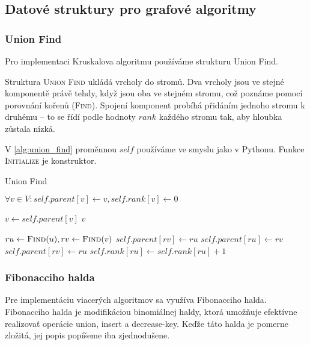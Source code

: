 \subsection{Datové struktury pro grafové algoritmy}
\label{subsec:data_structures}

\subsubsection*{Union Find}
Pro implementaci Kruskalova
algoritmu používáme strukturu Union Find.

Struktura \textsc{Union Find} ukládá vrcholy do stromů.
Dva vrcholy jsou ve stejné komponentě právě tehdy, když jsou oba
ve stejném stromu, což poznáme pomocí porovnání kořenů (\textsc{Find}).
Spojení komponent probíhá přidáním jednoho stromu k druhému -- to se
řídí podle hodnoty $rank$ každého stromu tak, aby hloubka zůstala nízká.

V \autoref{alg:union_find} proměnnou $self$ používáme ve smyslu jako v
Pythonu. Funkce \textsc{Initialize} je konstruktor.

\begin{algorithm}[H]
\caption{Union Find}
\label{alg:union_find}
\begin{algorithmic}[1]
    \State $\forall v \in V : self.parent[v] \gets v, self.rank[v] \gets 0$
\EndFunction

        \State $v \gets self.parent[v]$
    \EndWhile
    \State \Return $v$
\EndFunction

    \State $ru \gets \Call{Find}{u}, rv \gets \Call{Find}{v}$
            \State $self.parent[rv] \gets ru$
            \State $self.parent[ru] \gets rv$
        \Else
            \State $self.parent[rv] \gets ru$
            \State $self.rank[ru] \gets self.rank[ru] + 1$
        \EndIf
    \EndIf
\EndFunction

\end{algorithmic}
\end{algorithm}

\subsubsection*{Fibonacciho halda}

Pre implementáciu viacerých algoritmov sa využíva Fibonacciho halda.
Fibonacciho halda je modifikáciou binomiálnej haldy, ktorá umožňuje
efektívne realizovať operácie union, insert a decrease-key.
Keďže táto halda je pomerne zložitá, jej popis popíšeme iba zjednodušene.


